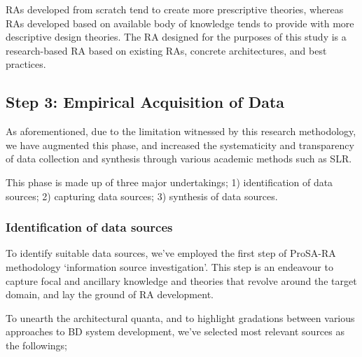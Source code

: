 \documentclass[review]{elsarticle}
\begin{document}
RAs developed from scratch tend to create more prescriptive theories, whereas RAs developed based on available body of knowledge tends to provide with more descriptive design theories. The RA designed for the purposes of this study is a research-based RA based on existing RAs, concrete architectures, and best practices.

\subsection{Step 3: Empirical Acquisition of Data }

As aforementioned, due to the limitation witnessed by this research methodology, we have augmented this phase, and increased the systematicity and transparency of data collection and synthesis through various academic methods such as SLR.

This phase is made up of three major undertakings; 1) identification of data sources; 2) capturing data sources; 3) synthesis of data sources.

\subsubsection{Identification of data sources}

To identify suitable data sources, we've employed the first step of ProSA-RA methodology `information source investigation'. This step is an endeavour to capture focal and ancillary knowledge and theories that revolve around the target domain, and lay the ground of RA development.

To unearth the architectural quanta, and to highlight gradations between various approaches to BD system development, we've selected most relevant sources as the followings;
\end{document}
